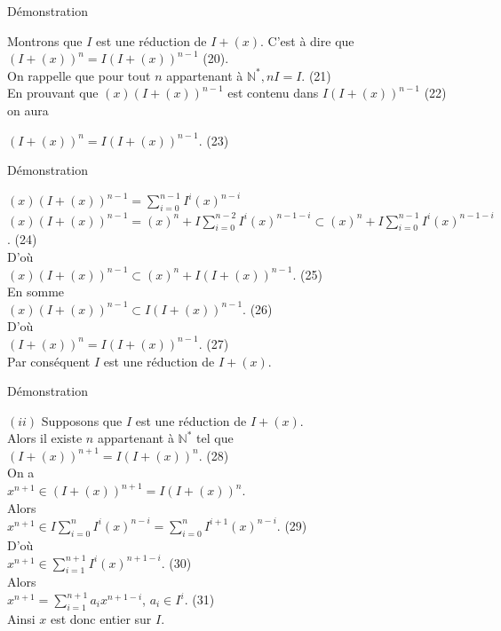 \documentclass[11pt,a4paper]{beamer}
\begin{document}
	
			\begin{frame}{Démonstration}
		\begin{block}{}
			Montrons que $I$ est une réduction de $I + (x)$. C'est à dire que $(I+(x))^{n} = I(I+(x))^{n-1}$ (20).\\ On rappelle que pour tout $n $ appartenant à $ \mathbb{N}^*, nI = I.$ (21)\\
			En prouvant que $(x)(I+(x))^{n-1} $ est contenu dans $ I(I+(x))^{n-1}$ (22) on aura
			\begin{center}
				$(I+(x))^n = I(I+(x))^{n-1}$. (23)
			\end{center}
		\end{block}
	\end{frame}
	\begin{frame}{Démonstration}
		\begin{block}{}
			$(x)(I+(x))^{n-1} = \displaystyle \sum_{i=0}^{n-1}{I^i (x)^{n-i}}$ \\
			$(x)(I+(x))^{n-1} = (x)^n + I\displaystyle \sum_{i=0}^{n-2}{I^i (x)^{n-1-i}} \subset (x)^n + \displaystyle I\sum_{i=0}^{n-1}{I^i (x)^{n-1-i}}$. (24)\\
			D'où \\$(x)(I+(x))^{n-1} \subset (x)^n + I(I+(x))^{n-1}.$ (25)\\
			En somme \\$(x)(I+(x))^{n-1} \subset I(I+(x))^{n-1}.$ (26) \\ D'où \\$ (I+(x))^{n} = I(I+(x))^{n-1}$. (27)\\
			Par conséquent $I$ est une réduction de $I + (x)$.
		\end{block}
	\end{frame}
	
	
					\begin{frame}{Démonstration}
		\begin{block}{}
				$(ii)$ Supposons que $I$ est une réduction de $I + (x)$.\\
			Alors il existe $ n $ appartenant à $ \mathbb{N^*}$ tel que \\ $(I + (x))^{n+1} = I(I + (x))^{n}$. (28)\\
			On a \\ $x^{n+1} \in (I + (x))^{n+1} = I(I + (x))^{n}$. \\Alors \\ $x^{n+1} \in I\displaystyle \sum_{i=0}^{n}{I^i (x)^{n-i}} = \displaystyle \sum_{i=0}^{n}{I^{i+1} (x)^{n-i}}$. (29)\\
			D'où \\$x^{n+1} \in \displaystyle \sum_{i=1}^{n+1}{I^i (x)^{n+1-i}}$. (30)\\ Alors \\$ x^{n+1} =  \displaystyle \sum_{i=1}^{n+1}{a_i x^{n+1-i}}$,  $a_i \in I^i$. (31)\\ Ainsi $x$ est donc entier sur $I$.
		\end{block}
	\end{frame}
	
\end{document}
